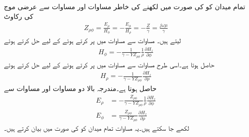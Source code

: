 تمام میدان کو  کی صورت میں لکھنے کی خاطر مساوات  اور مساوات  سے عرضی موج کی رکاوٹ 
\begin{align}\label{مساوات_مویج_نلکی_عرضی_برقی_رکاوٹ}
Z_{\rho \phi}=\frac{E_{\rho}}{H_{\phi}}=-\frac{E_{\phi}}{H_{\rho}}=-\frac{Z}{\gamma}=\frac{j\omega \mu}{\gamma}
\end{align}
لیتے ہیں۔  مساوات  سے  مساوات  میں پر کرتے ہوئے  کے لیے حل کرتے ہوئے
\begin{align}\label{مساوات_مویج_نلکی_مقناطیسی_زاویائی}
H_{\phi}=-\frac{1}{\gamma-YZ_{\rho \phi}} \frac{1}{\rho}\frac{\partial H_z}{\partial \phi} 
\end{align}
حاصل ہوتا ہے۔اسی طرح مساوات  سے  مساوات  میں پر کرتے ہوئے
 کے لیے حل کرتے ہوئے
\begin{align}\label{مساوات_مویج_نلکی_مقناطیسی_رداسی}
H_{\rho}=-\frac{1}{\gamma-YZ_{\rho \phi}}\frac{\partial H_z}{\partial \rho} 
\end{align}
حاصل ہوتا ہے۔مندرجہ بالا دو مساوات اور مساوات  سے
\begin{align}
E_{\rho}&=-\frac{Z_{\rho \phi}}{\gamma-YZ_{\rho \phi}} \frac{1}{\rho}\frac{\partial H_z}{\partial \phi} \label{مساوات_مویج_نلکی_برقی_رداسی} \\
E_{\phi}&=\frac{Z_{\rho \phi}}{\gamma-YZ_{\rho \phi}}\frac{\partial H_z}{\partial \rho} \label{مساوات_مویج_نلکی_برقی_زاویائی}
\end{align}
لکھے جا سکتے ہیں۔یہ مساوات تمام میدان کو  کی صورت میں بیان کرتے ہیں۔

